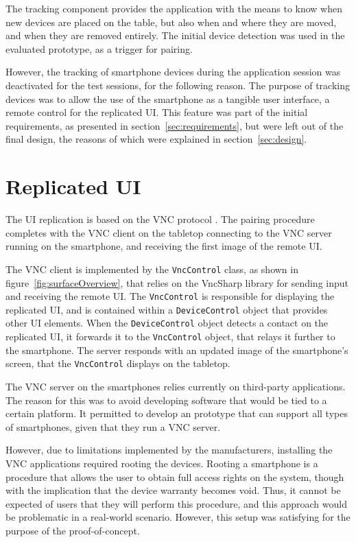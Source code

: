 The tracking component provides the application with the means to know when new devices are placed on the table, but also when and where they are moved, and when they are removed entirely.
The initial device detection was used in the evaluated prototype, as a trigger for pairing.

However, the tracking of smartphone devices during the application session was deactivated for the test sessions, for the following reason.
The purpose of tracking devices was to allow the use of the smartphone as a tangible user interface, a remote control for the replicated UI.
This feature was part of the initial requirements, as presented in section~\ref{sec:requirements}, but were left out of the final design, the reasons of which were explained in section~\ref{sec:design}.



\section{Replicated UI}
\label{sec:replicatedui}

The UI replication is based on the VNC protocol \citep{Richardson:1998:vnc}.
The pairing procedure completes with the VNC client on the tabletop connecting to the VNC server running on the smartphone, and receiving the first image of the remote UI.

The VNC client is implemented by the \texttt{VncControl} class, as shown in figure~\ref{fig:surfaceOverview}, that relies on the VncSharp library for sending input and receiving the remote UI.
The \texttt{VncControl} is responsible for displaying the replicated UI, and is contained within a \texttt{DeviceControl} object that provides other UI elements.
When the \texttt{DeviceControl} object detects a contact on the replicated UI, it forwards it to the \texttt{VncControl} object, that relays it further to the smartphone.
The server responds with an updated image of the smartphone's screen, that the \texttt{VncControl} displays on the tabletop.

The VNC server on the smartphones relies currently on third-party applications.
The reason for this was to avoid developing software that would be tied to a certain platform.
It permitted to develop an prototype that can support all types of smartphones, given that they run a VNC server.

However, due to limitations implemented by the manufacturers, installing the VNC applications required rooting the devices.
Rooting a smartphone is a procedure that allows the user to obtain full access rights on the system, though with the implication that the device warranty becomes void.
Thus, it cannot be expected of users that they will perform this procedure, and this approach would be problematic in a real-world scenario.
However, this setup was satisfying for the purpose of the proof-of-concept.

